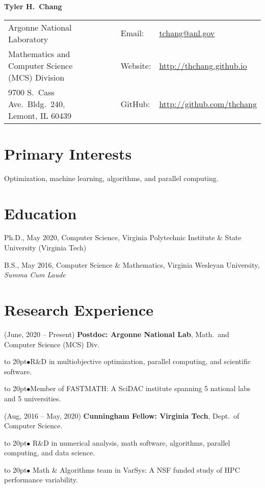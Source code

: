 \documentclass[11pt]{article}
\def\bullitem{\par\hangindent=15pt \hangafter=1
\noindent\hbox to 20pt{\hfil$\bullet$\hfil}\ignorespaces}
\begin{document}
{\large \textbf{Tyler H.\ Chang}}

\begin{tabular}{llll}
    Argonne National Laboratory & $\quad$
        & Email:&\href{mailto:tchang@anl.gov}{tchang@anl.gov}\\
    Mathematics and Computer Science (MCS) Division & $\quad$
        & Website:&\url{http://thchang.github.io}\\
    9700 S.\ Cass Ave.\ Bldg.\ 240, Lemont, IL 60439 & $\quad$
        & GitHub:&\url{http://github.com/thchang} \\
\end{tabular}

\section*{Primary Interests}

Optimization, machine learning, algorithms, and parallel computing.

\section*{Education}

Ph.D., May 2020, Computer Science,
Virginia Polytechnic Institute \& State University
(Virginia Tech)

\medskip

B.S., May 2016, Computer Science \& Mathematics,
Virginia Wesleyan University, \textit{Summa Cum Laude}

\section*{Research Experience}

\hangindent=0.3in
(June, 2020 -- Present)
\textbf{Postdoc: Argonne National Lab},
Math.\ and Computer Science (MCS) Div.
\bullitem R\&D in multiobjective optimization, parallel computing, and
scientific software.
\bullitem Member of FASTMATH: A SciDAC institute spanning
5 national labs and 5 universities.

\medskip

\hangindent=0.3in
(Aug, 2016 -- May, 2020)
\textbf{Cunningham Fellow: Virginia Tech},
Dept.\ of Computer Science.
\bullitem
R\&D in numerical analysis, math software,
algorithms, parallel computing, and data science.
\bullitem
Math \& Algorithms team in VarSys: A NSF funded study of
HPC performance variability.
\end{document}

